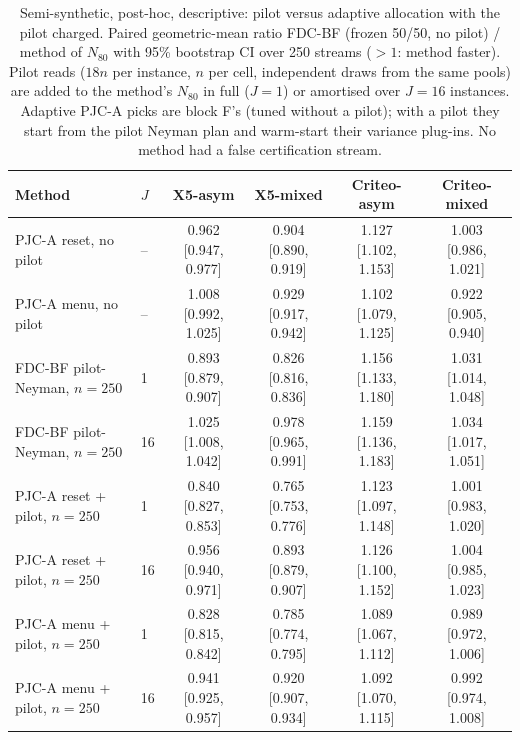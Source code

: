 \begin{table}[t]
\centering\small
\setlength{\tabcolsep}{2.5pt}
\caption{Semi-synthetic, post-hoc, descriptive: pilot versus adaptive allocation with the pilot charged. Paired geometric-mean ratio FDC-BF (frozen 50/50, no pilot) / method of $N_{80}$ with 95\% bootstrap CI over 250 streams ($>1$: method faster). Pilot reads ($18n$ per instance, $n$ per cell, independent draws from the same pools) are added to the method's $N_{80}$ in full ($J{=}1$) or amortised over $J{=}16$ instances. Adaptive PJC-A picks are block F's (tuned without a pilot); with a pilot they start from the pilot Neyman plan and warm-start their variance plug-ins. No method had a false certification stream.}
\label{tab:posthocF2}
\begin{tabular}{llcccc}
\toprule
Method & $J$ & X5-asym & X5-mixed & Criteo-asym & Criteo-mixed \\
\midrule
PJC-A reset, no pilot & -- & 0.962 {\scriptsize[0.947, 0.977]} & 0.904 {\scriptsize[0.890, 0.919]} & 1.127 {\scriptsize[1.102, 1.153]} & 1.003 {\scriptsize[0.986, 1.021]} \\
PJC-A menu, no pilot & -- & 1.008 {\scriptsize[0.992, 1.025]} & 0.929 {\scriptsize[0.917, 0.942]} & 1.102 {\scriptsize[1.079, 1.125]} & 0.922 {\scriptsize[0.905, 0.940]} \\
\midrule
FDC-BF pilot-Neyman, $n{=}250$ & 1 & 0.893 {\scriptsize[0.879, 0.907]} & 0.826 {\scriptsize[0.816, 0.836]} & 1.156 {\scriptsize[1.133, 1.180]} & 1.031 {\scriptsize[1.014, 1.048]} \\
FDC-BF pilot-Neyman, $n{=}250$ & 16 & 1.025 {\scriptsize[1.008, 1.042]} & 0.978 {\scriptsize[0.965, 0.991]} & 1.159 {\scriptsize[1.136, 1.183]} & 1.034 {\scriptsize[1.017, 1.051]} \\
PJC-A reset + pilot, $n{=}250$ & 1 & 0.840 {\scriptsize[0.827, 0.853]} & 0.765 {\scriptsize[0.753, 0.776]} & 1.123 {\scriptsize[1.097, 1.148]} & 1.001 {\scriptsize[0.983, 1.020]} \\
PJC-A reset + pilot, $n{=}250$ & 16 & 0.956 {\scriptsize[0.940, 0.971]} & 0.893 {\scriptsize[0.879, 0.907]} & 1.126 {\scriptsize[1.100, 1.152]} & 1.004 {\scriptsize[0.985, 1.023]} \\
PJC-A menu + pilot, $n{=}250$ & 1 & 0.828 {\scriptsize[0.815, 0.842]} & 0.785 {\scriptsize[0.774, 0.795]} & 1.089 {\scriptsize[1.067, 1.112]} & 0.989 {\scriptsize[0.972, 1.006]} \\
PJC-A menu + pilot, $n{=}250$ & 16 & 0.941 {\scriptsize[0.925, 0.957]} & 0.920 {\scriptsize[0.907, 0.934]} & 1.092 {\scriptsize[1.070, 1.115]} & 0.992 {\scriptsize[0.974, 1.008]} \\

\end{tabular}
\end{table}
